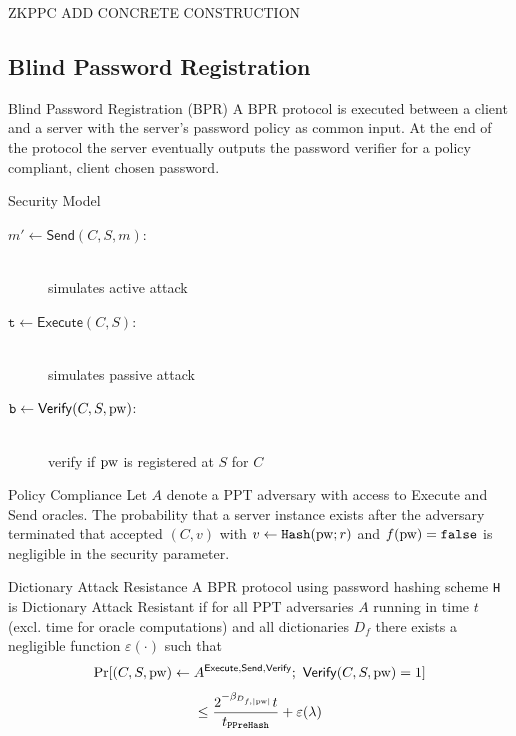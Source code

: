 \documentclass[notes,xcolor=dvipsnames]{beamer}
\begin{document}
\begin{frame}{ZKPPC}
  \alert{ADD CONCRETE CONSTRUCTION}
\end{frame}

\subsection[BPR]{Blind Password Registration}

\begin{frame}{Blind Password Registration (BPR)}
  A BPR protocol is executed between a client and a server with the server's password policy as common input.
  At the end of the protocol the server eventually outputs the password verifier for a policy compliant, client chosen password.
\end{frame}

\begin{frame}{Security Model}

  \begin{description}
    \item[$m'\gets\mathsf{Send}(C,S,m)$:] \hfill \\ simulates active attack
    \item[$\mathtt{t}\gets\mathsf{Execute}(C,S)$:] \hfill \\ simulates passive attack
    \item[$\mathtt{b}\gets\mathsf{Verify}(C,S,\mathrm{pw})$:] \hfill \\ verify if $\mathrm{pw}$ is registered at $S$ for $C$
  \end{description}

\end{frame}

\begin{frame}{Policy Compliance}
  Let $A$ denote a PPT adversary with access to Execute and Send oracles. The probability that a server instance exists after the adversary terminated that accepted $(C, v)$ with $v \gets \mathtt{Hash}(\mathrm{pw}; r)$ and $f(\mathrm{pw})=\mathtt{false}$ is negligible in the security parameter.
\end{frame}

\begin{frame}{Dictionary Attack Resistance}
  A BPR protocol using password hashing scheme \texttt{H} is Dictionary Attack Resistant if for all PPT adversaries $A$ running in time $t$ (excl. time for oracle computations) and all dictionaries $D_f$ there exists a negligible function $\varepsilon(\cdot)$ such that
  \[
    \Pr[(C, S, \mathrm{pw}) \gets A^{\mathsf{Execute},\mathsf{Send},\mathsf{Verify}}; ~ \mathsf{Verify}(C, S, \mathrm{pw})=1]
  \]
  \[
    \leq \frac{2^{-\beta_{D_{f,|\mathrm{pw}|}}}t}{t_{\mathtt{PPreHash}}} + \varepsilon(\lambda)
  \]
\end{frame}
\end{document}
